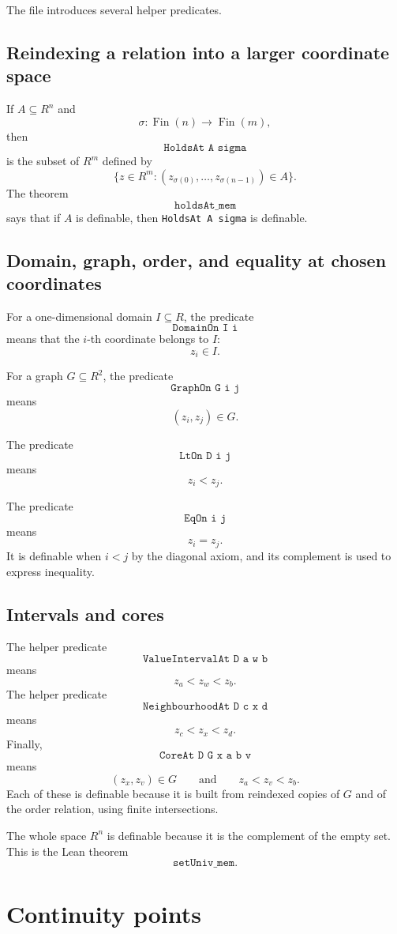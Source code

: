 \documentclass[11pt]{article}
\newcommand{\Lean}[1]{\texttt{#1}}
\begin{document}
The file introduces several helper predicates.

\subsection{Reindexing a relation into a larger coordinate space}

If $A\subseteq R^n$ and
\[
  \sigma:\operatorname{Fin}(n)\to\operatorname{Fin}(m),
\]
then
\[
  \Lean{HoldsAt A sigma}
\]
is the subset of $R^m$ defined by
\[
  \{z\in R^m:(z_{\sigma(0)},\ldots,z_{\sigma(n-1)})\in A\}.
\]
The theorem
\[
  \Lean{holdsAt\_mem}
\]
says that if $A$ is definable, then \Lean{HoldsAt A sigma} is definable.

\subsection{Domain, graph, order, and equality at chosen coordinates}

For a one-dimensional domain $I\subseteq R$, the predicate
\[
  \Lean{DomainOn I i}
\]
means that the $i$-th coordinate belongs to $I$:
\[
  z_i\in I.
\]

For a graph $G\subseteq R^2$, the predicate
\[
  \Lean{GraphOn G i j}
\]
means
\[
  (z_i,z_j)\in G.
\]

The predicate
\[
  \Lean{LtOn D i j}
\]
means
\[
  z_i<z_j.
\]

The predicate
\[
  \Lean{EqOn i j}
\]
means
\[
  z_i=z_j.
\]
It is definable when $i<j$ by the diagonal axiom, and its complement is used to express inequality.

\subsection{Intervals and cores}

The helper predicate
\[
  \Lean{ValueIntervalAt D a w b}
\]
means
\[
  z_a<z_w<z_b.
\]
The helper predicate
\[
  \Lean{NeighbourhoodAt D c x d}
\]
means
\[
  z_c<z_x<z_d.
\]
Finally,
\[
  \Lean{CoreAt D G x a b v}
\]
means
\[
  (z_x,z_v)\in G
  \qquad\text{and}\qquad
  z_a<z_v<z_b.
\]
Each of these is definable because it is built from reindexed copies of $G$ and of the order relation,
using finite intersections.

The whole space $R^n$ is definable because it is the complement of the empty set.  This is the Lean
theorem
\[
  \Lean{setUniv\_mem}.
\]

\section{Continuity points}
\end{document}
